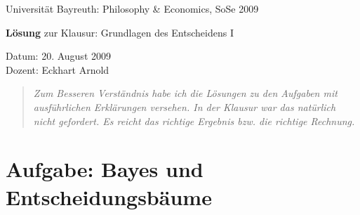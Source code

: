 \documentclass[10pt, a4paper, german]{article}
\numberwithin {equation}{section}
\begin{document}
\begin{center}
{\large Universität Bayreuth: Philosophy \& Economics, SoSe 2009}
\end{center}
\vspace{0.4em}
\begin{center}
{\huge {\bf Lösung} zur Klausur: Grundlagen des Entscheidens I}
\end{center}
\vspace{0.0em}
\begin{center}
Datum: 20. August 2009\\
Dozent: Eckhart Arnold
\end{center}

\begin{quote}
  {\em Zum Besseren Verständnis habe ich die Lösungen zu den Aufgaben mit
  ausführlichen Erklärungen versehen. In der Klausur war das natürlich
  nicht gefordert. Es reicht das richtige Ergebnis bzw. die richtige
  Rechnung.}
\end{quote}

\section{Aufgabe: Bayes und Entscheidungsbäume}

% 
% 
\end{document}
